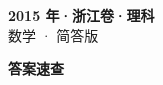 \documentclass[zihao=-4, a4paper]{ctexart}
\begin{document}
\begin{center}
  {\Large\bfseries 2015 年·浙江卷·理科}\\[4pt]
  {\large 数学 · 简答版}
\end{center}
\medskip
{}

\clearpage
{}
\begin{center}{\Large\bfseries 答案速查}\end{center}
\medskip

\end{document}
